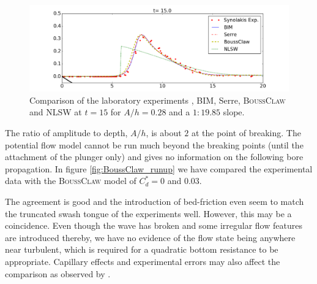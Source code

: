 \documentclass[review]{elsarticle}
\newcommand{\BoussClaw}{\textsc{BoussClaw} }
\begin{document}
\begin{figure}[!htb]
\centering
\includegraphics[width=\textwidth]{_fig/lab_bim_bouss_t15.png}
\caption{Comparison of the laboratory experiments \citep{synolakis1987runup}, BIM, Serre, \BoussClaw and NLSW at $t=15$ for $A/h=0.28$ 
and a $1:19.85$ slope.}
\label{fig:lab_bim}
\end{figure}

The ratio of amplitude to depth, $A/h$, 
is about $2$ at the point of breaking.
The potential flow model cannot be run much beyond the
breaking points (until the attachment of the plunger only) and 
gives no information on the following bore propagation.
In figure \ref{fig:BoussClaw_runup} we have compared
the experimental data with the \BoussClaw model 
of $C_d^* = 0$ and $0.03$.

The agreement is good and the introduction of bed-friction 
even seem to match the truncated swash tongue of the experiments well. However, this may be a coincidence. 
Even though the  wave has broken and some irregular flow features are introduced thereby, we have no evidence of the flow state being
anywhere near turbulent, which is required for a quadratic bottom resistance to be appropriate. 
Capillary effects and 
experimental errors may also affect the comparison
as observed by \cite{Pedersen:2013}.
\end{document}
